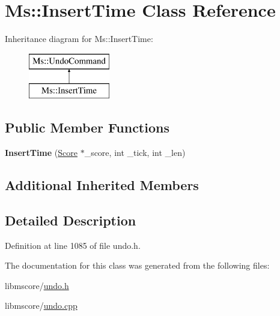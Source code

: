 \hypertarget{class_ms_1_1_insert_time}{}\section{Ms\+:\+:Insert\+Time Class Reference}
\label{class_ms_1_1_insert_time}
Inheritance diagram for Ms\+:\+:Insert\+Time\+:\begin{figure}[H]
\begin{center}
\leavevmode
\includegraphics[height=2.000000cm]{class_ms_1_1_insert_time}
\end{center}
\end{figure}
\subsection*{Public Member Functions}
\begin{DoxyCompactItemize}
\item 
\mbox{\label{class_ms_1_1_insert_time_af59b539a71bb19b53b4dae49ff3bb939}} 
{\bfseries Insert\+Time} (\hyperlink{class_ms_1_1_score}{Score} $\ast$\+\_\+score, int \+\_\+tick, int \+\_\+len)
\end{DoxyCompactItemize}
\subsection*{Additional Inherited Members}


\subsection{Detailed Description}


Definition at line 1085 of file undo.\+h.



The documentation for this class was generated from the following files\+:\begin{DoxyCompactItemize}
\item 
libmscore/\hyperlink{undo_8h}{undo.\+h}\item 
libmscore/\hyperlink{undo_8cpp}{undo.\+cpp}\end{DoxyCompactItemize}
